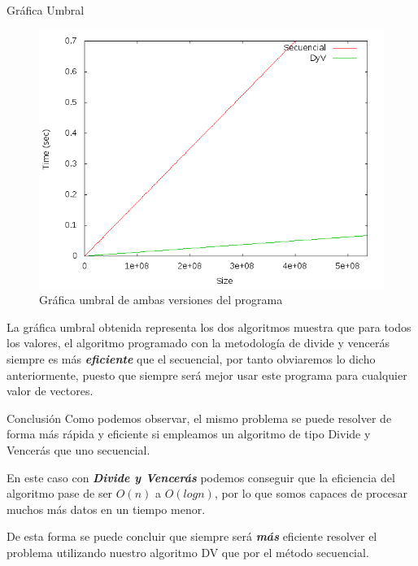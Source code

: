 \documentclass[12pt]{beamer}
\begin{document}
\begin{frame}{Gráfica Umbral}

\begin{figure}[H] 
\centering
\includegraphics[angle=0,scale=0.5]{img/umbral.png} 
\caption{Gráfica umbral de ambas versiones del programa} 
\end{figure}
 
\end{frame}

\begin{frame}{}
\justify
La gráfica umbral obtenida representa los dos algoritmos muestra que para todos los valores, el algoritmo programado con la metodología de divide y vencerás siempre es más \textbf{\textit{eficiente}} que el secuencial, por tanto obviaremos lo dicho anteriormente, puesto que siempre será mejor usar este programa para cualquier valor de vectores.
 
\end{frame}

\begin{frame}{Conclusión}
\justify
Como podemos observar, el mismo problema se puede resolver de forma más rápida y eficiente si empleamos un algoritmo de tipo Divide y Vencerás que uno secuencial.

\vspace{3mm} %
\justify
En este caso con \textbf{\textit{Divide y Vencerás}} podemos conseguir que la eficiencia del algoritmo pase de ser $O(n)$ a $O(log n)$, por lo que somos capaces de procesar muchos más datos en un tiempo menor. 

\vspace{3mm} %
\justify
De esta forma se puede concluir que siempre será \textbf{\textit{más}} eficiente resolver el problema utilizando nuestro algoritmo DV que por el método secuencial.
\end{frame}
\end{document}
